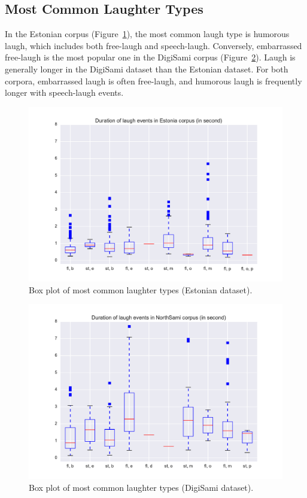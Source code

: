 \documentclass[10pt,journal,compsoc]{IEEEtran}
\begin{document}
\subsection{Most Common Laughter Types}

In the Estonian corpus (Figure~\ref{fig:EE-duration-boxplot-types}), the most common laugh type is humorous laugh, which includes both free-laugh and speech-laugh. Conversely, embarrassed free-laugh is the most popular one in the DigiSami corpus (Figure~\ref{fig:DS-duration-boxplot-types}). Laugh is generally longer in the DigiSami dataset than the Estonian dataset. For both corpora, embarrassed laugh is often free-laugh, and humorous laugh is frequently longer with speech-laugh events.

\begin{figure}[!t]
\centering
\includegraphics[width=1\linewidth]{figures/estonia/duration_boxplot_all.pdf}
\caption{Box plot of most common laughter types (Estonian dataset).}
\label{fig:EE-duration-boxplot-types}
\end{figure}

\begin{figure}[!t]
\centering
\includegraphics[width=1\linewidth]{figures/sami/duration_boxplot_all.pdf}
\caption{Box plot of most common laughter types (DigiSami dataset).}
\label{fig:DS-duration-boxplot-types}
\end{figure}
\end{document}
